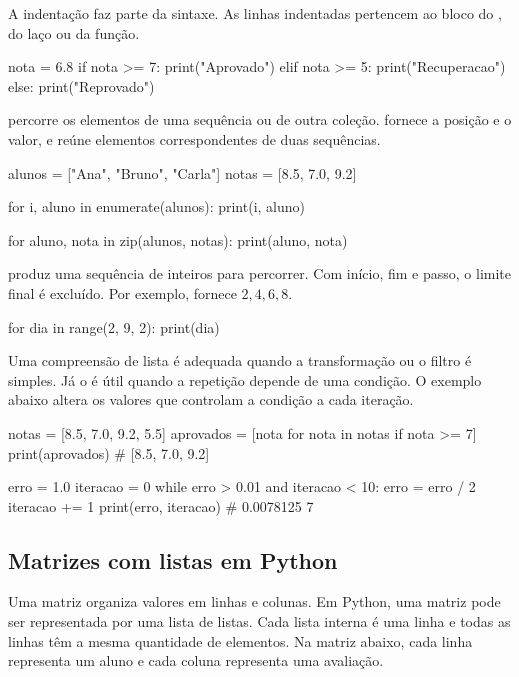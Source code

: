 A indentação faz parte da sintaxe. As linhas indentadas pertencem ao bloco do , do laço ou da função.

\begin{exemplo}
nota = 6.8
if nota >= 7:
    print("Aprovado")
elif nota >= 5:
    print("Recuperacao")
else:
    print("Reprovado")
\end{exemplo}

 percorre os elementos de uma sequência ou de outra coleção.  fornece a posição e o valor, e  reúne elementos correspondentes de duas sequências.

\begin{exemplo}
alunos = ["Ana", "Bruno", "Carla"]
notas = [8.5, 7.0, 9.2]

for i, aluno in enumerate(alunos):
    print(i, aluno)

for aluno, nota in zip(alunos, notas):
    print(aluno, nota)
\end{exemplo}

 produz uma sequência de inteiros para percorrer. Com início, fim e passo, o limite final é excluído. Por exemplo,  fornece \(2,4,6,8\).

\begin{exemplo}
for dia in range(2, 9, 2):
    print(dia)
\end{exemplo}

Uma compreensão de lista é adequada quando a transformação ou o filtro é simples. Já o  é útil quando a repetição depende de uma condição. O exemplo abaixo altera os valores que controlam a condição a cada iteração.

\begin{exemplo}
notas = [8.5, 7.0, 9.2, 5.5]
aprovados = [nota for nota in notas if nota >= 7]
print(aprovados)  # [8.5, 7.0, 9.2]

erro = 1.0
iteracao = 0
while erro > 0.01 and iteracao < 10:
    erro = erro / 2
    iteracao += 1
print(erro, iteracao)  # 0.0078125 7
\end{exemplo}

\subsection{Matrizes com listas em Python}
\label{sec:matrizes-python}

Uma matriz organiza valores em linhas e colunas. Em Python, uma matriz pode ser representada por uma lista de listas. Cada lista interna é uma linha e todas as linhas têm a mesma quantidade de elementos. Na matriz abaixo, cada linha representa um aluno e cada coluna representa uma avaliação.

